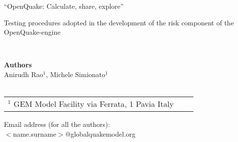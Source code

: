 \documentclass[11pt,fleqn]{book} %
\begin{document}





\begingroup
\thispagestyle{empty}
\par\normalfont\fontsize{15}{15}\sffamily\selectfont
“OpenQuake: Calculate, share, explore”
\centering
\vspace*{9cm}
\par\normalfont\fontsize{35}{35}\sffamily\selectfont
Testing procedures adopted in the development of the risk 
component of the OpenQuake-engine\par %
\endgroup


\newpage
~\vfill
\thispagestyle{empty}

\noindent
   \textbf{Authors} \\
   Anirudh Rao$^1$, Michele Simionato$^1$ \hfill \\
   \hfill \\
   \small
   \begin{tabular}{p{4cm}p{4cm}p{4cm}}
   $^1$ GEM Model Facility \hfill \newline
   via Ferrata, 1 \hfill \newline
   20133 Pavia \hfill \newline
   Italy \hfill \newline
   \end{tabular} \hfill \newline
   Email address (for all the authors):\hfill\\
   $<$name.surname$>$@globalquakemodel.org\hfill\\
   \normalsize
\end{document}

